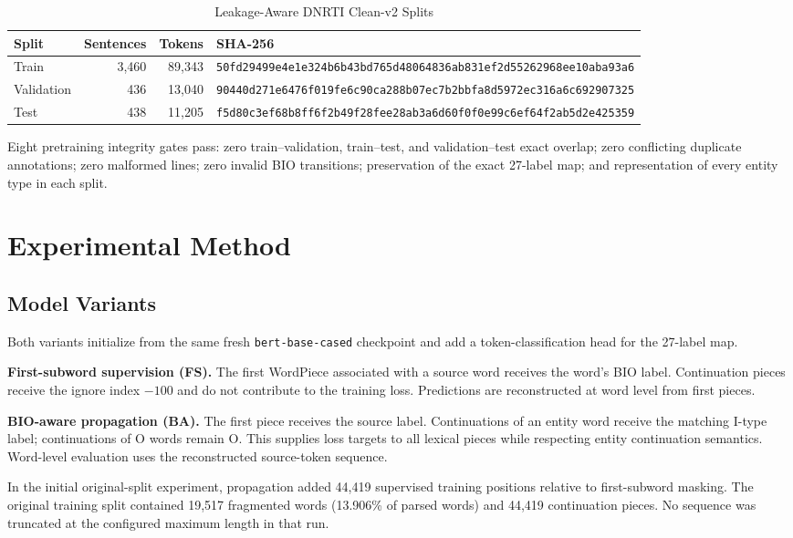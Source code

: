 \documentclass[conference]{IEEEtran}
\begin{document}
\begin{table}[t]
\caption{Leakage-Aware DNRTI Clean-v2 Splits}
\label{tab:clean-splits}
\centering
\small
\begin{tabular}{lrrl}
\toprule
Split & Sentences & Tokens & SHA-256 \\
\midrule
Train & 3,460 & 89,343 & \texttt{50fd29499e4e1e324b6b43bd765d48064836ab831ef2d55262968ee10aba93a6} \\
Validation & 436 & 13,040 & \texttt{90440d271e6476f019fe6c90ca288b07ec7b2bbfa8d5972ec316a6c692907325} \\
Test & 438 & 11,205 & \texttt{f5d80c3ef68b8ff6f2b49f28fee28ab3a6d60f0f0e99c6ef64f2ab5d2e425359} \\
\bottomrule
\end{tabular}
\end{table}

Eight pretraining integrity gates pass: zero train--validation, train--test, and validation--test exact overlap; zero conflicting duplicate annotations; zero malformed lines; zero invalid BIO transitions; preservation of the exact 27-label map; and representation of every entity type in each split.

\section{Experimental Method}
\subsection{Model Variants}
Both variants initialize from the same fresh \texttt{bert-base-cased} checkpoint and add a token-classification head for the 27-label map.

\textbf{First-subword supervision (FS).} The first WordPiece associated with a source word receives the word's BIO label. Continuation pieces receive the ignore index $-100$ and do not contribute to the training loss. Predictions are reconstructed at word level from first pieces.

\textbf{BIO-aware propagation (BA).} The first piece receives the source label. Continuations of an entity word receive the matching I-type label; continuations of O words remain O. This supplies loss targets to all lexical pieces while respecting entity continuation semantics. Word-level evaluation uses the reconstructed source-token sequence.

In the initial original-split experiment, propagation added 44,419 supervised training positions relative to first-subword masking. The original training split contained 19,517 fragmented words (13.906\% of parsed words) and 44,419 continuation pieces. No sequence was truncated at the configured maximum length in that run.
\end{document}
